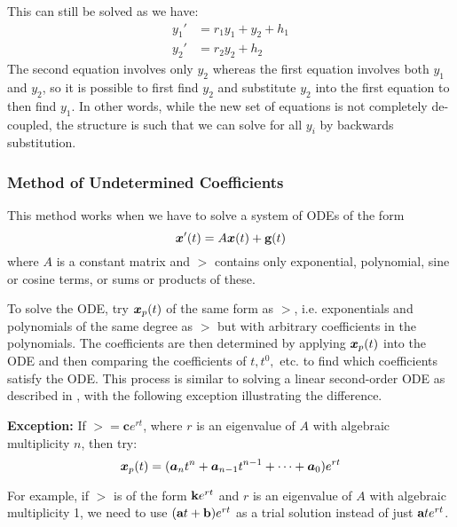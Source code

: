 This can still be solved as we have:
\begin{align*}
	y_1' &= r_1y_1 + y_2 + h_1 \\
	y_2' &= r_2y_2 + h_2
\end{align*}
The second equation involves only $y_2$ whereas the first equation involves both $y_1$ and $y_2$, so it is possible to first find $y_2$ and substitute $y_2$ into the first equation to then find $y_1$. In other words, while the new set of equations is not completely de-coupled, the structure is such that we can solve for all $y_i$ by backwards substitution.

\subsubsection{Method of Undetermined Coefficients}

This method works when we have to solve a system of ODEs of the form
\[
\bm{x}'(t) = A\bm{x}(t) + \textbf{g}(t)
\] 
where $A$ is a constant matrix and $\gt$ contains only exponential, polynomial, sine or cosine terms, or sums or products of these.

To solve the ODE, try $\bm{x}_p(t)$ of the same form as $\gt$, i.e. exponentials and polynomials of the same degree as $\gt$ but with arbitrary coefficients in the polynomials. The coefficients are then determined by applying $\bm{x}_p(t)$ into the ODE and then comparing the coefficients of $t, t^0, $ etc. to find which coefficients satisfy the ODE. This process is similar to solving a linear second-order ODE as described in , with the following exception illustrating the difference.

\textbf{Exception:} If $\gt = \bm{c} e^{rt}$, where $r$ is an eigenvalue of $A$ with algebraic multiplicity $n$, then try:
\[
	\bm{x}_p(t) = (\bm{a}_n t^n+\bm{a}_{n-1} t^{n-1} + \cdots + \bm{a}_0)e^{rt}
\]

For example, if $\gt$ is of the form $\textbf{k}e^{rt}$ and $r$ is an eigenvalue of $A$ with algebraic multiplicity 1, we need to use $(\textbf{a}t + \textbf{b})e^{rt}$ as a trial solution instead of just $\textbf{a}te^{rt}$.


